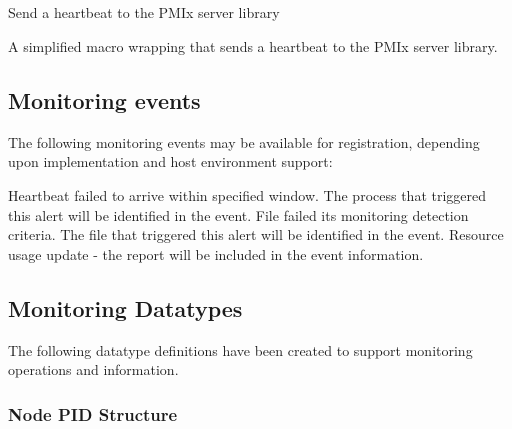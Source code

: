 \subsection{}

\summary

Send a heartbeat to the \ac{PMIx} server library

\format



\descr

A simplified macro wrapping  that sends a heartbeat to the \ac{PMIx} server library.

\subsection{Monitoring events}
\label{api:struct:events:monitor}

The following monitoring events may be available for registration, depending upon implementation and host environment support:

\begin{constantdesc}
%
Heartbeat failed to arrive within specified window. The process that triggered this alert will be identified in the event.
%
File failed its monitoring detection criteria. The file that triggered this alert will be identified in the event.
%
Resource usage update - the report will be included in the event information.
%
\end{constantdesc}

\subsection{Monitoring Datatypes}

The following datatype definitions have been created to support monitoring operations and information.

\subsubsection{Node PID Structure}

